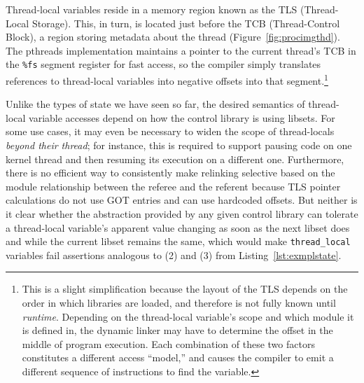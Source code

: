 Thread-local variables reside in a memory region known as the TLS (Thread-Local
Storage).  This, in turn, is located just before the TCB (Thread-Control Block), a
region storing metadata about the thread (Figure~\ref{fig:procimgthd}).  The pthreads
implementation maintains a pointer to the current thread's TCB in the \texttt{\%fs}
segment register for fast access, so the compiler simply translates references to
thread-local variables into negative offsets into that segment.\footnote{This is a
slight simplification because the layout of the TLS depends on the order in which
libraries are loaded, and therefore is not fully known until \textit{runtime}.
Depending on the thread-local variable's scope and which module it is defined in, the
dynamic linker may have to determine the offset in the middle of program execution.
Each combination of these two factors constitutes a different access ``model,'' and
causes the compiler to emit a different sequence of instructions to find the
variable.}

Unlike the types of state we have seen so far, the desired semantics of thread-local
variable accesses depend on how the control library is using libsets.  For some use
cases, it may even be necessary to widen the scope of thread-locals \textit{beyond
their thread}; for instance, this is required to support pausing code on one kernel
thread and then resuming its execution on a different one.  Furthermore, there is no
efficient way to consistently make relinking selective based on the module
relationship between the referee and the referent because TLS pointer calculations do
not use GOT entries and can use hardcoded offsets.  But neither is it clear whether
the abstraction provided by any given control library can tolerate a thread-local
variable's apparent value changing as soon as the next libset does and while the
current libset remains the same, which would make \texttt{thread\_local} variables
fail assertions analogous to (2) and (3) from Listing~\ref{lst:exmplstate}.

